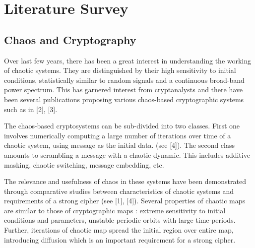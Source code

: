 \chapter{Literature Survey}
\label{chap:lit}
\setlength{\parskip}{1.5mm}
\section{Chaos and Cryptography}
Over last few years, there has been a great interest in understanding the working of chaotic systems. They are distinguished by their high sensitivity to initial conditions, statistically similar to random signals and a continuous broad-band power spectrum. This has garnered interest from cryptanalysts and there have been several publications proposing various chaos-based cryptographic systems such as in [2], [3].

The chaos-based cryptosystems can be sub-divided into two classes. First one involves numerically computing a large number of iterations over time of a chaotic system, using message as the initial data. (see [4]). The second class amounts to scrambling a message with a chaotic dynamic. This includes additive masking, chaotic switching, message embedding, etc.

The relevance and usefulness of chaos in these systems have been demonstrated through comparative studies between characteristics of chaotic systems and requirements of a strong cipher (see [1], [4]). Several properties of chaotic maps are similar to those of cryptographic maps : extreme sensitivity to initial conditions and parameters, unstable periodic orbits with large time-periods. Further, iterations of chaotic map spread the initial region over entire map, introducing diffusion which is an important requirement for a strong cipher.

